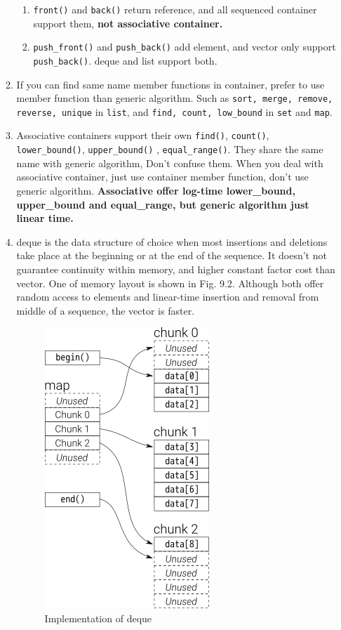 \documentclass[a4paper,11pt,twoside]{book}
\begin{document}
\begin{itemize}
\begin{enumerate}
\begin{enumerate}
\item \texttt{front()} and \texttt{back()} return reference, and all sequenced container support them, \textbf{not associative container.}

\item \texttt{push\_front()} and \texttt{push\_back()} add element, and vector only support \texttt{push\_back()}. deque and list support both.
\end{enumerate}

\item  If you can find same name member functions in container, prefer to use member function than generic algorithm. Such as \texttt{sort, merge, remove, reverse, unique} in \texttt{list}, and \texttt{find, count, low\_bound} in \texttt{set} and \texttt{map}. 

\item Associative containers support their own \texttt{find()}, \texttt{count()},  \texttt{lower\_bound()}, \texttt{upper\_bound()} , \texttt{equal\_range()}. They share the same name with generic algorithm, Don't confuse them. When you deal with associative container, just use container member function, don't use generic algorithm. \textbf{Associative offer log-time lower\_bound, upper\_bound and equal\_range, but generic algorithm just linear time.}


\item deque is the data structure of choice when most insertions and deletions take place at the beginning or at the end of the sequence. It doesn't not guarantee continuity within memory, and higher constant factor cost than vector. One of memory layout is shown in Fig. 9.2.  Although both offer random access to elements and linear-time insertion and removal from middle of a sequence, the vector is faster.  

\begin{figure}[ht]
	\centering
	\includegraphics[width=0.2\linewidth]{pics/queue.png}
	\caption{Implementation of deque}
	\label{fig:queue}
\end{figure}



\end{enumerate}
\end{itemize}
\end{document}
